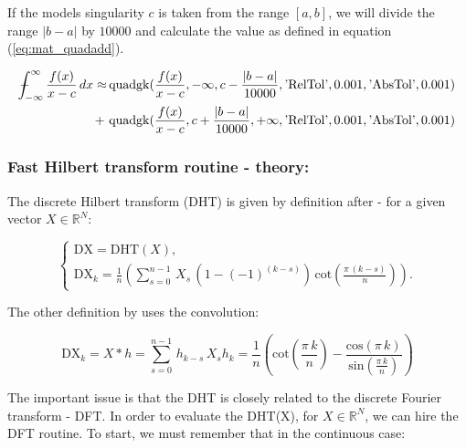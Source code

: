 \documentclass[12pt,twoside,a4paper]{article}
\numberwithin{equation}{subsection}
\numberwithin{figure}{subsection}
\def\Xint#1{\mathchoice
{\XXint\displaystyle\textstyle{#1}}%
{\XXint\textstyle\scriptstyle{#1}}%
{\XXint\scriptstyle\scriptscriptstyle{#1}}%
{\XXint\scriptscriptstyle\scriptscriptstyle{#1}}%
\!\int}
\def\XXint#1#2#3{{\setbox0=\hbox{$#1{#2#3}{\int}$ }\vcenter{\hbox{$#2#3$ }}\kern-.6\wd0}}
\def\dashint{\Xint-}
\begin{document}
If the models singularity $c$ is taken from the range $[a, b]$, we will divide the range $|b-a|$ by $10000$ and calculate the value
as defined in equation (\ref{eq:mat_quadadd}). 
 
\begin{alignat}{1} \label{eq:mat_quadadd}
  \dashint_{ - \infty }^{\infty } \frac {f(x)}{x-c} \, dx \approx 
          & \, \mathrm{quadgk}(\frac {f(x)}{x-c}, - \infty, c - \frac{|b-a|}{10000}, \text{'RelTol'}, 0.001, \text{'AbsTol'}, 0.001 ) \\
     + \, & \, \mathrm{quadgk}(\frac {f(x)}{x-c}, c + \frac{|b-a|}{10000}, + \infty, \text{'RelTol'}, 0.001, \text{'AbsTol'}, 0.001 )
     \nonumber
\end{alignat}
 
\subsubsection*{Fast Hilbert transform routine - theory:}

The discrete Hilbert transform (DHT) is given by definition after \cite{kak_multilayeredarray} - for a given vector $X \in \mathbb{R} ^ N$:

\begin{equation} \label{eq:matlab_fhttheroy}
	\begin{cases}
		\mathrm{DX} = \mathrm{DHT}(X), \\
		\mathrm{DX}_k = \frac {1}{n} 
			\left( 
				\sum_{s = 0}^{n - 1} \, X_s \, (1 - ( - 1)^{(k - s)})\,\mathrm{cot}(\frac {\pi \,(k - s) }{n}) 
			\right).
	\end{cases}
\end{equation}

The other definition by \cite{calvetti_computation} uses the convolution:

\begin{subequations} \label{eq:matlab_convolution}
	\begin{equation}   \label{eq:mconv_dht}
		\mathrm{DX}_k = X * h = \sum_{s=0}^{n - 1}\,{h_{k - s}}\,{X_{s}}
	\end{equation}
	\begin{equation}   \label{eq:mconv_hk}
    	h_k = \frac{1}{n} 
    	\left(  
    		\mathrm{cot}(\frac {\pi \, k}{n}) - \frac{\mathrm{cos}(\pi \, k)}{\mathrm{sin}(\frac {\pi \, k}{n})}
		\right) 
	\end{equation}
\end{subequations}

The important issue is that the DHT is closely related to the discrete Fourier transform - DFT. In order to evaluate the DHT(X), for $X \in
\mathbb{R} ^ N$, we can hire the DFT routine. To start, we must remember that in the continuous case:
\end{document}
